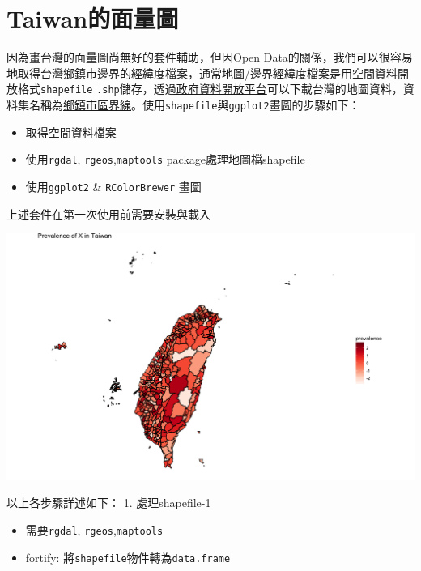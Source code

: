 \documentclass[]{book}
\newenvironment{Shaded}{\begin{snugshade}}{\end{snugshade}}
\newcommand{\KeywordTok}[1]{\textcolor[rgb]{0.13,0.29,0.53}{\textbf{{#1}}}}
\newcommand{\DataTypeTok}[1]{\textcolor[rgb]{0.13,0.29,0.53}{{#1}}}
\newcommand{\DecValTok}[1]{\textcolor[rgb]{0.00,0.00,0.81}{{#1}}}
\newcommand{\StringTok}[1]{\textcolor[rgb]{0.31,0.60,0.02}{{#1}}}
\newcommand{\CommentTok}[1]{\textcolor[rgb]{0.56,0.35,0.01}{\textit{{#1}}}}
\newcommand{\NormalTok}[1]{{#1}}
\providecommand{\tightlist}{%
  \setlength{\itemsep}{0pt}\setlength{\parskip}{0pt}}
\theoremstyle{definition}
\theoremstyle{definition}
\theoremstyle{remark}
\begin{document}
\section{Taiwan的面量圖}\label{taiwan}

因為畫台灣的面量圖尚無好的套件輔助，但因Open
Data的關係，我們可以很容易地取得台灣鄉鎮市邊界的經緯度檔案，通常地圖/邊界經緯度檔案是用空間資料開放格式\texttt{shapefile}
\texttt{.shp}儲存，透過\href{http://data.gov.tw/}{政府資料開放平台}可以下載台灣的地圖資料，資料集名稱為\href{http://data.gov.tw/node/7441}{鄉鎮市區界線}。使用\texttt{shapefile}與\texttt{ggplot2}畫圖的步驟如下：

\begin{itemize}
\tightlist
\item
  取得空間資料檔案
\item
  使用\texttt{rgdal}, \texttt{rgeos},\texttt{maptools}
  package處理地圖檔shapefile
\item
  使用\texttt{ggplot2} \& \texttt{RColorBrewer} 畫圖
\end{itemize}

上述套件在第一次使用前需要安裝與載入

\includegraphics[width=15.71in]{figure/Taiwan}

以上各步驟詳述如下： 1. 處理shapefile-1

\begin{itemize}
\tightlist
\item
  需要\texttt{rgdal}, \texttt{rgeos},\texttt{maptools}
\item
  fortify: 將\texttt{shapefile}物件轉為\texttt{data.frame}
\end{itemize}

\begin{Shaded}
\end{Shaded}
\end{document}
